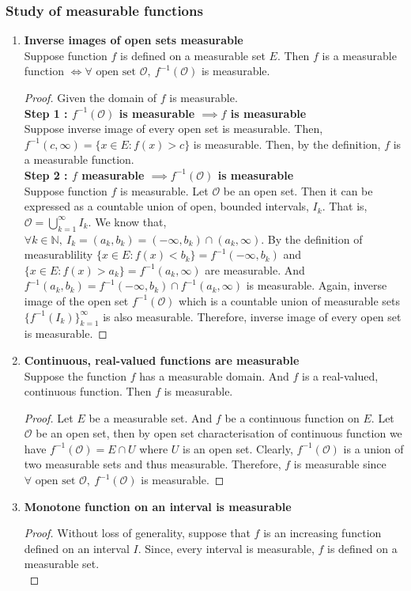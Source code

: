 \subsubsection{Study of measurable functions}
\begin{enumerate}
	\item \textbf{Inverse images of open sets measurable}\\
		Suppose function $f$ is defined on a measurable set $E$.
	Then $f$ is a measurable function $\iff \forall \text{ open set } \mathcal{O},\ f^{-1}(\mathcal{O})$ is measurable.
		\label{thm:measurabilityopen}
	\begin{proof}
	Given the domain of $f$ is measurable.\\
	\textbf{Step 1 : $f^{-1}(\mathcal{O})$ is measurable $\implies f$ is measurable}\\
	Suppose inverse image of every open set is measurable.
	Then, $f^{-1}(c,\infty) = \{ x \in E : f(x) > c \}$ is measurable.
	Then, by the definition, $f$ is a measurable function.\\

	\textbf{Step 2 : $f$ measurable $\implies f^{-1}(\mathcal{O})$ is measurable}\\
	Suppose function $f$ is measurable.
	Let $\mathcal{O}$ be an open set.
	Then it can be expressed as a countable union of open, bounded intervals, $I_k$.
	That is, $\displaystyle \mathcal{O} = \bigcup_{k=1}^\infty I_k$.
	We know that, $\forall k \in \mathbb{N},\ I_k = (a_k,b_k) = (-\infty,b_k) \cap (a_k,\infty)$.
	By the definition of measurablility $\{ x \in E : f(x) < b_k \} = f^{-1}(-\infty,b_k)$ and $\{ x\in E : f(x) > a_k \} = f^{-1}(a_k,\infty)$ are measurable.
	And $f^{-1}(a_k,b_k) = f^{-1}(-\infty,b_k) \cap f^{-1}(a_k,\infty)$  is measurable.
	Again, inverse image of the open set $f^{-1}(\mathcal{O})$ which is a countable union of measurable sets $\{f^{-1}(I_k)\}_{k=1}^\infty$ is also measurable.
	Therefore, inverse image of every open set is measurable.
	\end{proof}
\item \textbf{Continuous, real-valued functions are measurable}\\
	Suppose the function $f$ has a measurable domain. And $f$ is a real-valued, continuous function. Then $f$ is measurable.
	\begin{proof}
	Let $E$ be a measurable set.
	And $f$ be a continuous function on $E$.
	Let $\mathcal{O}$ be an open set, then by open set characterisation of continuous function we have $f^{-1}(\mathcal{O}) = E \cap U$ where $U$ is an open set.
	Clearly, $f^{-1}(\mathcal{O})$ is a union of two measurable sets and thus measurable.
	Therefore, $f$ is measurable since $\forall \text{ open set } \mathcal{O},\ f^{-1}(\mathcal{O})$ is measurable.
	\end{proof}
\item \textbf{Monotone function on an interval is measurable}
	\begin{proof}
		Without loss of generality, suppose that $f$ is an increasing function defined on an interval $I$.
		Since, every interval is measurable, $f$ is defined on a measurable set.\\


\end{proof}
\end{enumerate}
